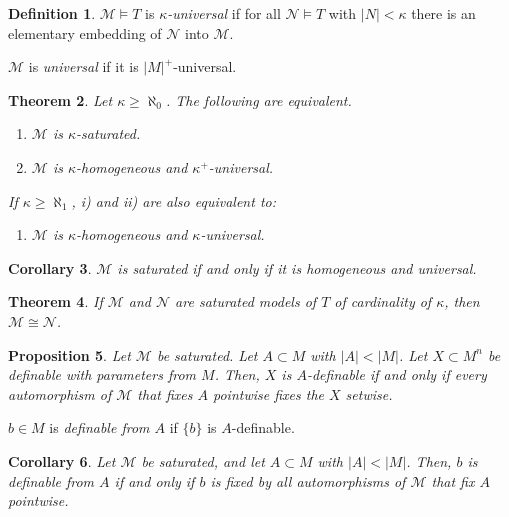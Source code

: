 \documentclass{amsart}
\newtheorem{theorem}{Theorem}[subsection]
\newtheorem{proposition}[theorem]{Proposition}
\newtheorem{corollary}[theorem]{Corollary}
\theoremstyle{definition}
\newtheorem{definition}[theorem]{Definition}
\numberwithin{equation}{section}
\begin{document}
\begin{definition}
  $\mathcal{M} \models T$ is \emph{$\kappa$-universal} if for all $\mathcal{N}\models T$ with $|N| < \kappa$ there is an elementary embedding of $\mathcal{N}$ into $\mathcal{M}$.

  $\mathcal{M}$ is \emph{universal} if it is $|M|^+$-universal.
\end{definition}

\begin{theorem}
  Let $\kappa \ge \aleph_0$.
  The following are equivalent.
  \begin{enumerate}[label = {\roman*)}]
    \item $\mathcal{M}$ is $\kappa$-saturated.
    \item $\mathcal{M}$ is $\kappa$-homogeneous and $\kappa^+$-universal.
  \end{enumerate}
  If $\kappa \ge \aleph_1$, i) and ii) are also equivalent to:
  \begin{enumerate}[resume, label = {\roman*)}]
    \item $\mathcal{M}$ is $\kappa$-homogeneous and $\kappa$-universal.
  \end{enumerate}
\end{theorem}

\begin{corollary}
  $\mathcal{M}$ is saturated if and only if it is homogeneous and universal.
\end{corollary}

\begin{theorem}
  If $\mathcal{M}$ and $\mathcal{N}$ are saturated models of $T$ of cardinality of $\kappa$,
  then $\mathcal{M}\cong\mathcal{N}$.
\end{theorem}

\begin{proposition}
  Let $\mathcal{M}$ be saturated.
  Let $A \subset M$ with $|A| < |M|$.
  Let $X \subset M^n$ be definable with parameters from $M$.
  Then, $X$ is $A$-definable if and only if every automorphism of $\mathcal{M}$ that fixes $A$ pointwise fixes the $X$ setwise.
\end{proposition}

$b \in M$ is \emph{definable from $A$} if $\{b\}$ is $A$-definable.
\begin{corollary}
  Let $\mathcal{M}$ be saturated,
  and let $A \subset M$ with $|A| < |M|$.
  Then, $b$ is definable from $A$ if and only if $b$ is fixed by all automorphisms of $\mathcal{M}$ that fix $A$ pointwise.
\end{corollary}
\end{document}
